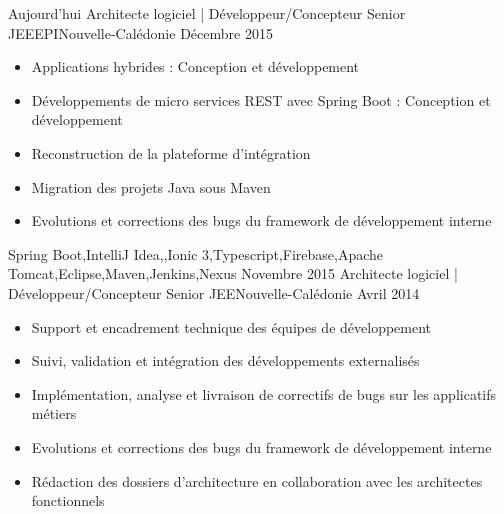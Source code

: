 %
%
%

\begin{experiences}
  \experience
    {Aujourd'hui}   {Architecte logiciel | Développeur/Concepteur Senior JEE}{EPI}{Nouvelle-Calédonie}
    {Décembre 2015} {
                      \begin{itemize}
                        \item Applications hybrides : Conception et développement
                        \item Développements de micro services REST avec Spring Boot : Conception et développement
                        \item Reconstruction de la plateforme d'intégration
                        \item Migration des projets Java sous Maven
                        \item Evolutions et corrections des bugs du framework de développement interne  
                      \end{itemize}
                    }
                    {Spring Boot,IntelliJ Idea,,Ionic 3,Typescript,Firebase,Apache Tomcat,Eclipse,Maven,Jenkins,Nexus}
  \emptySeparator
  \experience
    {Novembre 2015} {Architecte logiciel | Développeur/Concepteur Senior JEE}{}{Nouvelle-Calédonie}
    {Avril 2014}    {
                      \begin{itemize}
                        \item Support et encadrement technique des équipes de développement                           
                        \item Suivi, validation et intégration des développements externalisés                        
                        \item Implémentation, analyse et livraison de correctifs de bugs sur les applicatifs métiers  
                        \item Evolutions et corrections des bugs du framework de développement interne                
                        \item Rédaction des dossiers d'architecture en collaboration avec les architectes fonctionnels

\end{itemize}}
\end{experiences}
